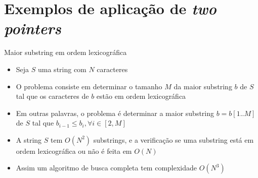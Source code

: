 \section{Exemplos de aplicação de {\it two pointers}}

\begin{frame}[fragile]{Maior substring em ordem lexicográfica}

    \begin{itemize}
        \item Seja $S$ uma string com $N$ caracteres

        \item O problema consiste em determinar o tamanho $M$ da maior substring $b$ de $S$ tal
            que os caracteres de $b$ estão em ordem lexicográfica

        \item Em outras palavras, o problema é determinar a maior substring $b=b[1..M]$ de
            $S$ tal que $b_{i - 1} \leq b_i, \forall i\in[2, M]$

        \item A string $S$ tem $O(N^2)$ substrings, e a verificação se uma substring está em
            ordem lexicográfica ou não é feita em $O(N)$

        \item Assim um algoritmo de busca completa tem complexidade $O(N^3)$

    \end{itemize}

\end{frame}

